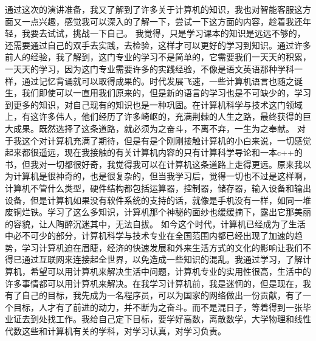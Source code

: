     通过这次的演讲准备，我又了解到了许多关于计算机的知识，我也对智能客服这方面又一点兴趣，感觉我可以深入的了解一下，尝试一下这方面的内容，趁着我还年轻，我要去试试，挑战一下自己。
   我觉得，只是学习课本的知识是远远不够的，还需要通过自己的双手去实践，去检验，这样才可以更好的学习到知识。通过许多前人的经验，我了解到，这门专业的学习不是简单的，它需要我们一天天的积累，一天天的学习，因为这门专业需要许多的实践经验，不像是语文英语那种学科一样，通过记忆背诵就可以取得成果的。时代发展飞速，一些计算机语言也随之诞生，我们即使可以一直用我们原来的，但是新的语言的学习也是不可缺少的，学习到更多的知识，对自己现有的知识也是一种巩固。在计算机科学与技术这门领域上，有这许多伟人，他们经历了许多崎岖的，充满荆棘的人生之路，最终获得的巨大成果。既然选择了这条道路，就必须为之奋斗，不离不弃，一生为之奉献。
   对于我这个对计算机充满了期待，但是有是个刚刚接触计算机的小白来说，一切感觉起来都很遥远，现在我接触的有关计算机内容的只有计算科学导论和一本c++的书，但我对一切都很好奇，我觉得我可以在计算机这条道路上走得更远。原来我以为计算机是很神奇的，也是很复杂的，但当我学习后，觉得一切也不过是这样啊，计算机不管什么类型，硬件结构都包括运算器，控制器，储存器，输入设备和输出设备，但是计算机如果没有软件系统的支持的话，就像是手机没有一样，如同一堆废铜烂铁。学习了这么多知识，计算机那个神秘的面纱也缓缓摘下，露出它那美丽的容貌，让人陶醉沉迷其中，无法自拔。
  如今这个时代，计算机已经成为了生活中必不可少的部分，计算机科学与技术专业在全国范围内都已经出现了加速的趋势，学习计算机迫在眉睫，经济的快速发展和外来生活方式的文化的影响让我们不得已通过互联网来连接起全世界，以免造成一些知识的混乱。我通过学习，了解计算机，希望可以用计算机来解决生活中问题，计算机专业的实用性很高，生活中的许多事情都可以用计算机来解决。在我学习计算机前，我是迷惘的，但是现在，我有了自己的目标，我先成为一名程序员，可以为国家的网络做出一份贡献，有了一个目标，人才有了前进的动力，并不断为之奋斗。而不是混日子，等着得到一张毕业证去到处找工作。我给自己定下目标，要学好高数，离散数学，大学物理和线性代数这些和计算机有关的学科，对学习认真，对学习负责。
